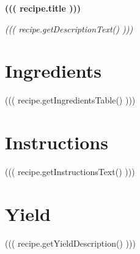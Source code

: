 

    \begin{center}
        {\Large \textbf{((( recipe.title )))}}
        
        \small\textit{((( recipe.getDescriptionText() )))}
    \end{center}
    
    \section*{Ingredients}
    \begin{center}
        ((( recipe.getIngredientsTable() )))
    \end{center}
    
    \section*{Instructions}
    ((( recipe.getInstructionsText() )))
    
    \section*{Yield}
    ((( recipe.getYieldDescription() )))


